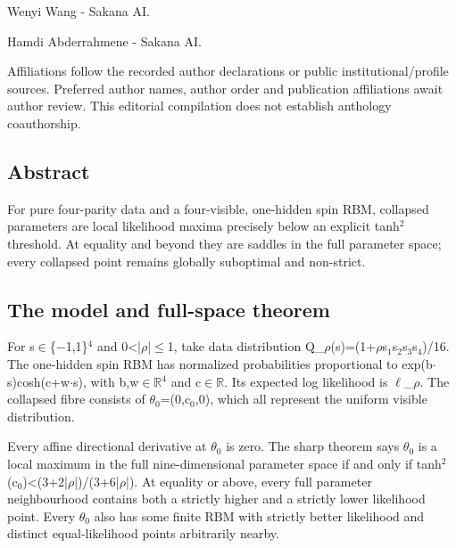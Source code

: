 \documentclass[11pt,a4paper]{article}
\begin{document}
{\small Wenyi Wang  -  Sakana AI.\par}

{\small Hamdi Abderrahmene  -  Sakana AI.\par}

{\small Affiliations follow the recorded author declarations or public institutional/profile sources. Preferred author names, author order and publication affiliations await author review. This editorial compilation does not establish anthology coauthorship.\par}

\subsection{Abstract}
For pure four-parity data and a four-visible, one-hidden spin RBM, collapsed parameters are local likelihood maxima precisely below an explicit tanh\ensuremath{^2} threshold. At equality and beyond they are saddles in the full parameter space; every collapsed point remains globally suboptimal and non-strict.

\subsection{The model and full-space theorem}
For s\ensuremath{\in}\{\ensuremath{-}1,1\}\ensuremath{^4} and 0<|\ensuremath{\rho}|\ensuremath{\leq}1, take data distribution Q\_\ensuremath{\rho}(s)=(1+\ensuremath{\rho}s\ensuremath{_1}s\ensuremath{_2}s\ensuremath{_3}s\ensuremath{_4})/16. The one-hidden spin RBM has normalized probabilities proportional to exp(b\ensuremath{\cdot}s)cosh(c+w\ensuremath{\cdot}s), with b,w\ensuremath{\in}\ensuremath{\mathbb{R}}\ensuremath{^4} and c\ensuremath{\in}\ensuremath{\mathbb{R}}. Its expected log likelihood is \ensuremath{\ell}\_\ensuremath{\rho}. The collapsed fibre consists of \ensuremath{\theta}\ensuremath{_0}=(0,c\ensuremath{_0},0), which all represent the uniform visible distribution.

Every affine directional derivative at \ensuremath{\theta}\ensuremath{_0} is zero. The sharp theorem says \ensuremath{\theta}\ensuremath{_0} is a local maximum in the full nine-dimensional parameter space if and only if tanh\ensuremath{^2}(c\ensuremath{_0})<(3+2|\ensuremath{\rho}|)/(3+6|\ensuremath{\rho}|). At equality or above, every full parameter neighbourhood contains both a strictly higher and a strictly lower likelihood point. Every \ensuremath{\theta}\ensuremath{_0} also has some finite RBM with strictly better likelihood and distinct equal-likelihood points arbitrarily nearby.
\end{document}
